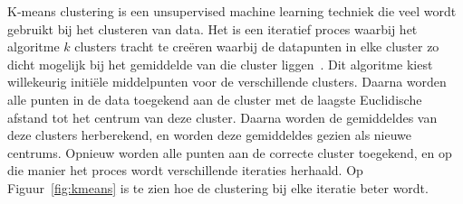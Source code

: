 K-means clustering is een unsupervised machine learning techniek die veel wordt
gebruikt bij het clusteren van data. Het is een iteratief proces waarbij het
algoritme $k$ clusters tracht te creëren waarbij de datapunten in elke cluster
zo dicht mogelijk bij het gemiddelde van die cluster
liggen~\cite{Understa24:online}. Dit algoritme kiest willekeurig initiële
middelpunten voor de verschillende clusters. Daarna worden alle punten in de
data toegekend aan de cluster met de laagste Euclidische afstand tot het
centrum van deze cluster. Daarna worden de gemiddeldes van deze clusters
herberekend, en worden deze gemiddeldes gezien als nieuwe centrums. Opnieuw
worden alle punten aan de correcte cluster toegekend, en op die manier het
proces wordt verschillende iteraties herhaald. Op Figuur~\ref{fig:kmeans} is te
zien hoe de clustering bij elke iteratie beter wordt.
